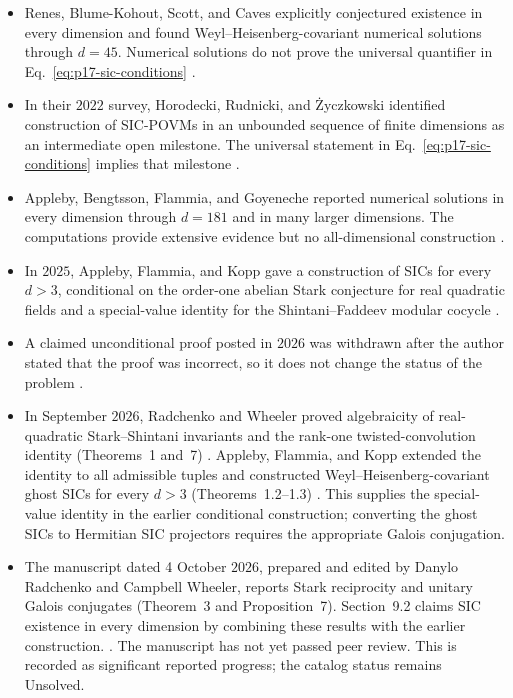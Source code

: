 \begin{itemize}
  \item Renes, Blume-Kohout, Scott, and Caves explicitly conjectured existence
  in every dimension and found Weyl--Heisenberg-covariant numerical solutions
  through $d=45$.  Numerical solutions do not prove the universal quantifier
  in Eq.~\eqref{eq:p17-sic-conditions}
  .

  \item In their $2022$ survey, Horodecki, Rudnicki, and \.{Z}yczkowski
  identified construction of SIC-POVMs in an unbounded sequence of finite
  dimensions as an intermediate open milestone. The universal statement in
  Eq.~\eqref{eq:p17-sic-conditions} implies that milestone
  .

  \item Appleby, Bengtsson, Flammia, and Goyeneche reported numerical solutions
  in every dimension through $d=181$ and in many larger dimensions.  The
  computations provide extensive evidence but no all-dimensional construction
  .

  \item In $2025$, Appleby, Flammia, and Kopp gave a construction of
  SICs for every $d>3$, conditional on the order-one abelian
  Stark conjecture for real quadratic fields and a special-value identity
  for the Shintani--Faddeev modular cocycle
  .

  \item A claimed unconditional proof posted in $2026$ was withdrawn after
  the author stated that the proof was incorrect, so it does not change the
  status of the problem
  .

  \item In September $2026$, Radchenko and Wheeler proved algebraicity of
  real-quadratic Stark--Shintani invariants and the rank-one
  twisted-convolution identity (Theorems~1 and~7)
  .
  Appleby, Flammia, and Kopp extended the identity to all admissible tuples
  and constructed Weyl--Heisenberg-covariant ghost SICs for every $d>3$
  (Theorems~1.2--1.3) .
  This supplies the special-value identity in the earlier conditional
  construction; converting the ghost SICs to Hermitian SIC projectors
  requires the appropriate Galois conjugation.

  \item The manuscript dated 4 October $2026$, prepared and edited by Danylo
  Radchenko and Campbell Wheeler, reports Stark reciprocity and unitary
  Galois conjugates (Theorem~3 and Proposition~7). Section~9.2 claims SIC existence in every dimension by combining
  these results with the earlier construction.
  .
  The manuscript has not yet passed peer review. This is recorded as
  significant reported progress; the catalog status remains Unsolved.
\end{itemize}

